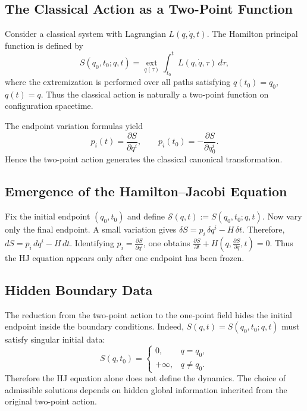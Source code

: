 \subsection{The Classical Action as a Two-Point Function}

Consider a classical system with Lagrangian
$L(q,\dot q,t)$.
The Hamilton principal function is defined by
\begin{equation}
S(q_0,t_0;q,t)=\operatorname*{ext}_{q(\tau)}
\int_{t_0}^{t} L(q,\dot q,\tau)\,d\tau,
\label{principal}
\end{equation}
where the extremization is performed over all paths satisfying
$q(t_0)=q_0$, $q(t)=q$.
Thus the classical action is naturally a two-point function on configuration spacetime.

The endpoint variation formulas yield
\begin{equation}
p_i(t)=\frac{\partial S}{\partial q^i},
\qquad
p_i(t_0)=-\frac{\partial S}{\partial q_0^i}.
\label{endpoint}
\end{equation}
Hence the two-point action generates the classical canonical transformation.

\subsection{Emergence of the Hamilton--Jacobi Equation}

Fix the initial endpoint $(q_0,t_0)$ and define
$\mathcal S(q,t):=S(q_0,t_0;q,t)$.
Now vary only the final endpoint. A small variation gives
$\delta S=p_i\,\delta q^i - H\,\delta t$.
Therefore,
$dS = p_i\,dq^i - H\,dt$.
Identifying $p_i=\frac{\partial S}{\partial q^i}$,
one obtains $\frac{\partial S}{\partial t}+
H\left(q,\frac{\partial S}{\partial q},t\right)=0$.
Thus the HJ equation appears only after one endpoint has been frozen.

\subsection{Hidden Boundary Data}

The reduction from the two-point action to the one-point field hides the
initial endpoint inside the boundary conditions.
Indeed, $S(q,t)=S(q_0,t_0;q,t)$
must satisfy singular initial data:
\begin{equation}
S(q,t_0)=
\begin{cases}
0, & q=q_0,\\
+\infty, & q\neq q_0.
\end{cases}
\end{equation}
Therefore the HJ equation alone does not define the dynamics. The choice of
admissible solutions depends on hidden global information inherited from the
original two-point action.

